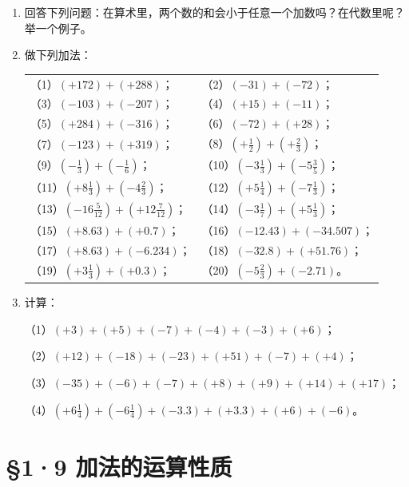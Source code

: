 \begin{enumerate}
\item
  回答下列问题：在算术里，两个数的和会小于任意一个加数吗？在代数里呢？举一个例子。
\item
  做下列加法：
  \par\smallskip
  \begin{tabular}{@{}ll@{}}
  （1）\((+172) + (+288)\)； & （2）\((-31) + (-72)\)； \\[4pt]
  （3）\((-103) + (-207)\)； & （4）\((+15) + (-11)\)； \\[4pt]
  （5）\((+284) + (-316)\)； & （6）\((-72) + (+28)\)； \\[4pt]
  （7）\((-123) + (+319)\)； & （8）\(\left(+\frac{1}{2}\right) + \left(+\frac{2}{3}\right)\)； \\[4pt]
  （9）\(\left(-\frac{1}{3}\right) + \left(-\frac{1}{6}\right)\)； & （10）\(\left(-3\frac{1}{3}\right) + \left(-5\frac{3}{5}\right)\)； \\[4pt]
  （11）\(\left(+8\frac{1}{3}\right) + \left(-4\frac{2}{3}\right)\)； & （12）\(\left(+5\frac{1}{4}\right) + \left(-7\frac{1}{3}\right)\)； \\[4pt]
  （13）\(\left(-16\frac{5}{12}\right) + \left(+12\frac{7}{12}\right)\)； & （14）\(\left(-3\frac{1}{7}\right) + \left(+5\frac{1}{3}\right)\)； \\[4pt]
  （15）\((+8.63) + (+0.7)\)； & （16）\((-12.43) + (-34.507)\)； \\[4pt]
  （17）\((+8.63) + (-6.234)\)； & （18）\((-32.8) + (+51.76)\)； \\[4pt]
  （19）\(\left(+3\frac{1}{3}\right) + (+0.3)\)； & （20）\(\left(-5\frac{2}{3}\right) + (-2.71)\)。
  \end{tabular}
\item
  计算：
  \par\smallskip
  （1）\((+3) + (+5) + (-7) + (-4) + (-3) + (+6)\)；
  \par
  （2）\((+12) + (-18) + (-23) + (+51) + (-7) + (+4)\)；
  \par
  （3）\((-35) + (-6) + (-7) + (+8) + (+9) + (+14) + (+17)\)；
  \par
  （4）\(\left(+6\frac{1}{4}\right) + \left(-6\frac{1}{4}\right) + (-3.3) + (+3.3) + (+6) + (-6)\)。
\end{enumerate}

\section{§1·9 加法的运算性质}

